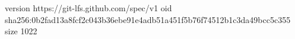 version https://git-lfs.github.com/spec/v1
oid sha256:0b2fad13a8fcf2c043b36ebe91e4adb51a451f5b76f74512b1c3da49bcc5c355
size 1022
